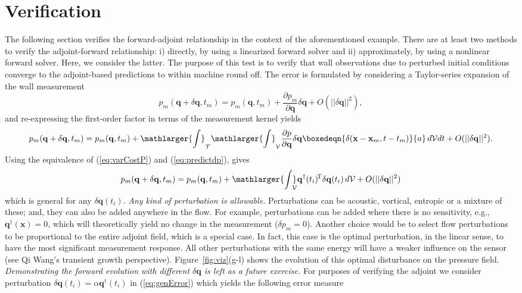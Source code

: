 \section{Verification}\label{s:verify}
The following section verifies the forward-adjoint relationship in the context of the aforementioned example. There are at least two methods to verify the adjoint-forward relationship: i) directly, by using a linearized forward solver and ii) approximately, by using a nonlinear forward solver. Here, we consider the latter. The purpose of this test is to verify that wall observations due to perturbed initial conditions converge to the adjoint-based predictions to within machine round off. The error is formulated by considering a Taylor-series expansion of the wall measurement
\begin{equation}
    p_m (\mathbf{q}+\delta\mathbf{q},t_m)=p_m(\mathbf{q},t_m) + \frac{\partial p_m}{\partial \mathbf{q}} \delta \mathbf{q} + O(||\delta \mathbf{q}||^2),
\end{equation}
and re-expressing the first-order factor in terms of the measurement kernel yields
\begin{equation}
    p_m (\mathbf{q}+\delta\mathbf{q},t_m)=p_m(\mathbf{q},t_m) + \mathlarger{\int}_{\mathcal{T}} \mathlarger{\int}_{\mathcal{V}} \frac{\partial p}{\partial \mathbf{q}}\delta{\mathbf{q}} \boxedeqn{\delta(\mathbf{x}-\mathbf{x}_m,t-t_m)}{a}\,d\mathcal{V} dt + O(||\delta \mathbf{q}||^2).
\end{equation}
Using the equivalence of (\ref{eq:varCostP}) and (\ref{eq:predictdp}), gives
\begin{equation}\label{eq:genError}
    p_m (\mathbf{q}+\delta\mathbf{q},t_m)=p_m(\mathbf{q},t_m) + {\mathlarger{\int}}_{\!\!\!\!\mathcal{V}} \mathbf{q}^\dagger(t_i)^{\!\mathrm{T}} \delta{\mathbf{q}}(t_i)\,d\mathcal{V} + O(||\delta \mathbf{q}||^2)
\end{equation}
which is general for any $\delta \mathbf{q}(t_i)$.  \textit{Any kind of perturbation is allowable.} Perturbations can be acoustic, vortical, entropic or a mixture of these; and, they can also be added anywhere in the flow. For example, perturbations can be added where there is no sensitivity, e.g., $\mathbf{q}^\dagger(\mathbf{x})=0$, which will theoretically yield no change in the measurement ($\delta p_m =0$).  Another choice would be to select flow perturbations to be proportional to the entire adjoint field, which is a special case. In fact, this case is the optimal perturbation, in the linear sense, to have the most significant measurement response. All other perturbations with the same energy will have a weaker influence on the sensor (see Qi Wang's transient growth perspective). Figure~\ref{fig:viz}(g-l) shows the evolution of this optimal disturbance on the pressure field. \textit{Demonstrating the forward evolution with different $\delta \mathbf{q}$ is left as a future exercise.} For purposes of verifying the adjoint we consider perturbation $\delta \mathbf{q}(t_i)=\alpha \mathbf{q}^\dagger(t_i)$ in (\ref{eq:genError}) which yields the following error measure  
